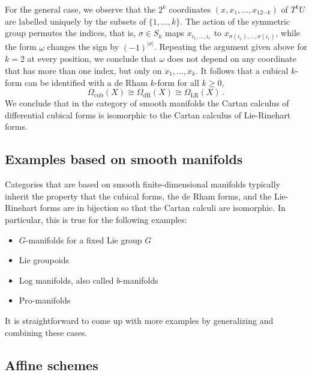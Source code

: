 \documentclass[12pt,reqno, a4paper]{amsart}
\numberwithin{equation}{section}
\theoremstyle{plain}
\theoremstyle{definition}
\theoremstyle{remark}
\begin{document}
For the general case, we observe that the $2^k$ coordinates $(x,x_1, \ldots, x_{12\cdots k})$ of $T^k U$ are labelled uniquely by the subsets of $\{1, \ldots, k\}$. The action of the symmetric group permutes the indices, that is, $\sigma \in S_k$ maps $x_{i_1, \ldots, i_r}$ to $x_{\sigma(i_1), \ldots, \sigma(i_r)}$, while the form $\omega$ changes the sign by $(-1)^{|\sigma|}$. Repeating the argument given above for $k=2$ at every position, we conclude that $\omega$ does not depend on any coordinate that has more than one index, but only on $x_1, \ldots, x_k$. It follows that a cubical $k$-form can be identified with a de Rham $k$-form for all $k \geq 0$,
\begin{equation*}
  \Omega_\mathrm{cub}(X) \cong \Omega_\mathrm{dR}(X)
  \cong \Omega_\mathrm{LR}(X)
  \,.
\end{equation*}
We conclude that in the category of smooth manifolds the Cartan calculus of differential cubical forms is isomorphic to the Cartan calculus of Lie-Rinehart forms.



\subsection{Examples based on smooth manifolds}

Categories that are based on smooth finite-dimensional manifolds typically inherit the property that the cubical forms, the de Rham forms, and the Lie-Rinehart forms are in bijection so that the Cartan calculi are isomorphic. In particular, this is true for the following examples:
\begin{itemize}

\item $G$-manifolds for a fixed Lie group $G$ \cite[\S 7.2]{AintablianBlohmann:2026}

\item Lie groupoids \cite[\S 7.3]{AintablianBlohmann:2026}

\item Log manifolds, also called $b$-manifolds \cite[\S 7.4]{AintablianBlohmann:2026}

\item Pro-manifolds \cite[\S 7.5]{AintablianBlohmann:2026}

\end{itemize}
It is straightforward to come up with more examples by generalizing and combining these cases.



\subsection{Affine schemes}
\label{sec:AffSchemes}
\end{document}
